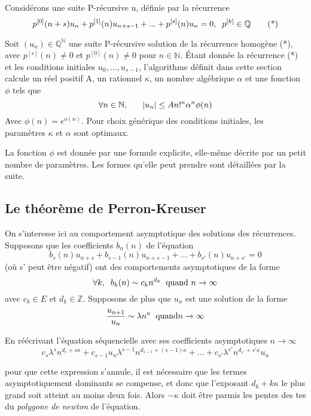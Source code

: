\documentclass[a4paper,10.5pt]{article}
\begin{document}
	Considérons une suite P-récursive u, définie par la récurrence
	\[p^{[0]}(n+s)u_{n}+p^{[1]}(n)u_{n+s-1}+...+p^{[s]}(n)u_{n}=0,\hspace{2mm} p^{[k]}\in \mathbb{Q} \tag{*}\] 
	\begin{theorem}Soit $(u_{n})\in \mathbb{Q}^{\mathbb{N}}$ une suite P-récursive solution de la récurrence homogène (*), avec $p^{[s]}(n) \neq 0$ et $p^{[0]}(n) \neq 0$ pour $n \in \mathbb{N}$. Étant donnée la récurrence (*) et les conditions initiales $u_{0},...,u_{s-1}$, l'algorithme définit dans cette section calcule un réel positif A, un rationnel $\kappa$, un nombre algébrique $\alpha$  et une fonction $\phi$ tels que
		\[\forall n\in \mathbb{N}, \hspace{6mm}|u_{n}| \leq A n!^{\kappa}\alpha^{n}\phi(n)\]
		Avec $\phi(n)=e^{o(n)}$. Pour choix générique des conditions initiales, les paramètres $\kappa$ et $\alpha$ sont optimaux.
	\end{theorem}
	
	La fonction $\phi$ est donnée par une formule explicite, elle-même décrite par un petit nombre de paramètres. Les formes qu'elle peut prendre sont détaillées par la suite.
	
	\subsection{Le théorème de Perron-Kreuser}
	
	On s'interesse ici au comportement asymptotique des solutions des récurrences. Supposons que les coefficients $b_{n}(n)$ de l'équation
	\[b_{s}(n)u_{n+s}+b_{s-1}(n)u_{n+s-1}+...+b_{s'}(n)u_{n+s'}=0  \tag{*}\]
	(où s' peut être négatif) ont des comportements asymptotiques de la forme
	\[\forall k, \hspace{2mm} b_{k}(n) \sim c_{k}n^{d_{k}} \hspace{2mm} \text{quand } n \rightarrow \infty\]
	avec $c_{k} \in E$ et $d_{k} \in \mathbb{Z}$. Supposons de plus que $u_{n}$ est une solution de la forme  
	\[\frac{u_{n+1}}{u_{n}}\sim \lambda n^{\kappa} \hspace{2mm} \text{quand}n \rightarrow \infty\]
	
	\noindent En réécrivant l'équation séquencielle avec ses coefficients asymptotiques $n \rightarrow \infty$
	\[c_{s}\lambda^{s} n^{d_{s}+s\kappa}+c_{s-1}u_{n}\lambda^{s-1} n^{d_{s-1}+(s-1)\kappa}+...+c_{s'}\lambda^{s'} n^{d_{s'}+s'\kappa}u_{n}\]
	
	pour que cette expression s'annule, il est nécessaire que les termes asymptotiquement dominants se compense, et donc que l'exposant $d_{k}+k\kappa$ le plus grand soit atteint au moins deux fois. Alors $-\kappa$ doit être parmis les pentes des tes du \textit{polygone de newton} de l'équation.
	
\end{document}
